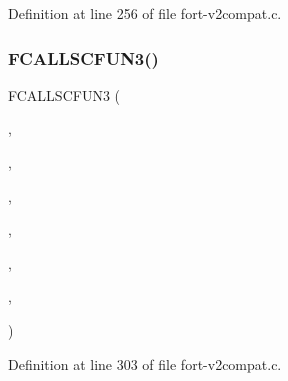 Definition at line 256 of file fort-\/v2compat.\+c.

\mbox{\label{fort-v2compat_8c_a2b3527c7932d252430e05f13777cfe55}} 
\subsubsection{\texorpdfstring{F\+C\+A\+L\+L\+S\+C\+F\+U\+N3()}{FCALLSCFUN3()}\hspace{0.1cm}{\footnotesize\ttfamily [2/4]}}
{\footnotesize\ttfamily F\+C\+A\+L\+L\+S\+C\+F\+U\+N3 (\begin{DoxyParamCaption}\item[{\hyperlink{ncfortran_8h_aec6fe8ae8c73cf5133d4ed64f86ff028}{N\+F\+\_\+\+I\+NT}}]{,  }\item[{\hyperlink{nf__v2compat_8c_a3144811f2328f7e62be2e0e4484aab43}{c\+\_\+ncopn}}]{,  }\item[{N\+C\+O\+PN}]{,  }\item[{\hyperlink{nf__fortv2_8f90_a43dce57f3c98cba43a7394b48ecd3184}{ncopn}}]{,  }\item[{S\+T\+R\+I\+NG}]{,  }\item[{\hyperlink{fort-v2compat_8c_a36ab2e26d67d11b7bfcb8843dc4bfb43}{R\+W\+M\+O\+DE}}]{,  }\item[{\hyperlink{fort-v2compat_8c_ae2352f39cbd25bcaf1bedbbb12db73fe}{P\+R\+C\+O\+DE}}]{ }\end{DoxyParamCaption})}



Definition at line 303 of file fort-\/v2compat.\+c.

\mbox{\label{fort-v2compat_8c_ae30afb7b813bb704e26a17d97d6f38e2}} 
